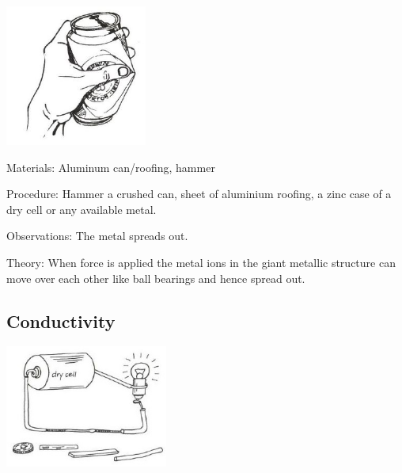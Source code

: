 \begin{multicols}{2}
\begin{center}
\includegraphics[width=0.35\textwidth]{./img/source/malleability.jpg}
\end{center}

\begin{description*}
\item[Materials:]{Aluminum can/roofing, hammer}
\item[Procedure:]{Hammer a crushed can, sheet of aluminium
roofing, a zinc case of a dry cell or any available
metal.}
\item[Observations:]{The metal spreads out.}
\item[Theory:]{When force is applied the metal ions in the
giant metallic structure can move over each
other like ball bearings and hence spread out.}
\end{description*}

\columnbreak

\subsection{Conductivity}

\begin{center}
\includegraphics[width=0.4\textwidth]{./img/vso/conductivity.jpg}
\end{center}


\end{multicols}

